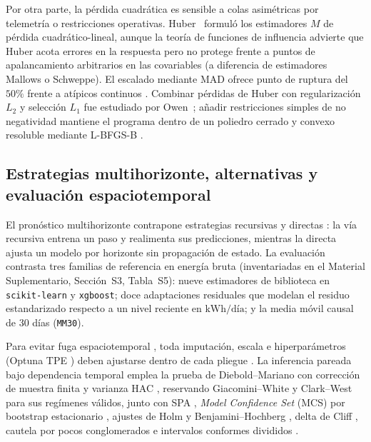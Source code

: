 Por otra parte, la pérdida cuadrática es sensible a colas asimétricas por telemetría o restricciones operativas. Huber~\cite{huber1964,huber2009robust} formuló los estimadores $M$ de pérdida cuadrático-lineal, aunque la teoría de funciones de influencia \cite{hampel1986robust} advierte que Huber acota errores en la respuesta pero no protege frente a puntos de apalancamiento arbitrarios en las covariables (a diferencia de estimadores Mallows o Schweppe). El escalado mediante MAD ofrece punto de ruptura del $50\%$ frente a atípicos continuos \cite{rousseeuw1993mad}. Combinar pérdidas de Huber con regularización $L_2$ \cite{hoerl1970} y selección $L_1$ \cite{tibshirani1996} fue estudiado por Owen~\cite{owen2007}; añadir restricciones simples de no negatividad mantiene el programa dentro de un poliedro cerrado y convexo \cite{boyd2004convex} resoluble mediante L-BFGS-B \cite{byrd1995lbfgsb,zhu1997lbfgsb,virtanen2020scipy}.

\subsection{Estrategias multihorizonte, alternativas y evaluación espaciotemporal}

El pronóstico multihorizonte contrapone estrategias recursivas y directas \cite{bentaieb2012,chevillon2007}: la vía recursiva entrena un paso y realimenta sus predicciones, mientras la directa ajusta un modelo por horizonte sin propagación de estado. La evaluación contrasta tres familias de referencia en energía bruta (inventariadas en el Material Suplementario, Sección~S3, Tabla~S5): nueve estimadores de biblioteca en \texttt{scikit-learn} \cite{pedregosa2011sklearn} y \texttt{xgboost}; doce adaptaciones residuales que modelan el residuo estandarizado respecto a un nivel reciente en $\text{kWh/día}$; y la media móvil causal de $30$ días (\texttt{MM30}).

Para evitar fuga espaciotemporal \cite{roberts2017crossvalidation,kaufman2012leakage,tashman2000,cerqueira2020}, toda imputación, escala e hiperparámetros (Optuna TPE \cite{bergstra2011tpe,akiba2019optuna}) deben ajustarse dentro de cada pliegue \cite{varma2006bias,cawley2010overfit}. La inferencia pareada bajo dependencia temporal emplea la prueba de Diebold--Mariano \cite{diebold1995} con corrección de muestra finita \cite{harvey1997} y varianza HAC \cite{newey1987}, reservando Giacomini--White \cite{giacomini2006tests} y Clark--West \cite{clark2007nested} para sus regímenes válidos, junto con SPA \cite{hansen2005spa}, \textit{Model Confidence Set} (MCS) \cite{hansen2011mcs} por bootstrap estacionario \cite{politis1994stationary}, ajustes de Holm \cite{holm1979} y Benjamini--Hochberg \cite{benjamini1995fdr}, delta de Cliff \cite{cliff1993dominance}, cautela por pocos conglomerados \cite{cameron2015cluster} e intervalos conformes divididos \cite{vovk2005conformal,lei2018conformal,barber2023nonexchangeable}.

